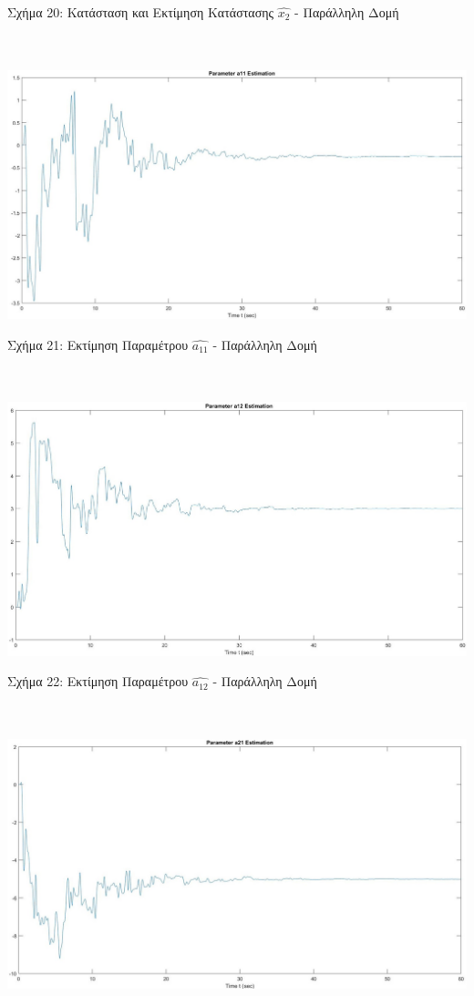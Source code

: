 \documentclass[12pt]{article}
\begin{document}
\centerline{Σχήμα 20: Κατάσταση και Εκτίμηση Κατάστασης $\hat{x_2}$ - Παράλληλη Δομή}
\\ \\
\includegraphics[width=\linewidth]{a11_estim_3.jpg}
\centerline{Σχήμα 21: Εκτίμηση Παραμέτρου $\hat{a_{11}}$ - Παράλληλη Δομή}
\\ \\
\includegraphics[width=\linewidth]{a12_estim_3.jpg}
\centerline{Σχήμα 22: Εκτίμηση Παραμέτρου $\hat{a_{12}}$ - Παράλληλη Δομή}
\\ \\
\includegraphics[width=\linewidth]{a21_estim_3.jpg}
\end{document}
